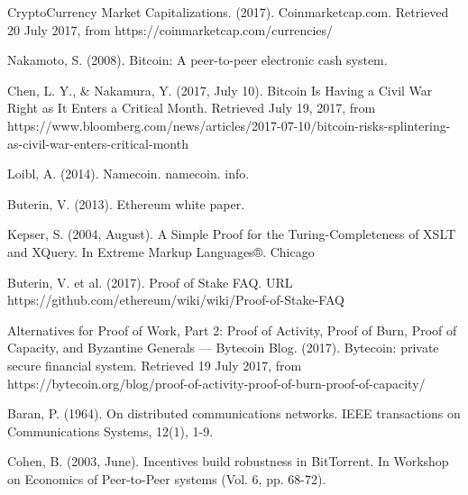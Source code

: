 \begin{thebibliography}{99}
CryptoCurrency Market Capitalizations. (2017). Coinmarketcap.com. Retrieved 20 July 2017, from https://coinmarketcap.com/currencies/

Nakamoto, S. (2008). Bitcoin: A peer-to-peer electronic cash system.

Chen, L. Y., \& Nakamura, Y. (2017, July 10). Bitcoin Is Having a Civil War Right as It Enters a Critical Month. Retrieved July 19, 2017, from https://www.bloomberg.com/news/articles/2017-07-10/bitcoin-risks-splintering-as-civil-war-enters-critical-month

Loibl, A. (2014). Namecoin. namecoin. info.

Buterin, V. (2013). Ethereum white paper.

Kepser, S. (2004, August). A Simple Proof for the Turing-Completeness of XSLT and XQuery. In Extreme Markup Languages®.
Chicago 

Buterin, V. et al. (2017). Proof of Stake FAQ. URL https://github.com/ethereum/wiki/wiki/Proof-of-Stake-FAQ

Alternatives for Proof of Work, Part 2: Proof of Activity, Proof of Burn, Proof of Capacity, and Byzantine Generals — Bytecoin Blog. (2017). Bytecoin: private secure financial system. Retrieved 19 July 2017, from https://bytecoin.org/blog/proof-of-activity-proof-of-burn-proof-of-capacity/

Baran, P. (1964). On distributed communications networks. IEEE transactions on Communications Systems, 12(1), 1-9.

Cohen, B. (2003, June). Incentives build robustness in BitTorrent. In Workshop on Economics of Peer-to-Peer systems (Vol. 6, pp. 68-72).

\end{thebibliography}

